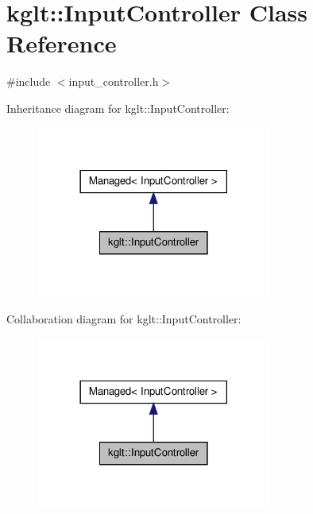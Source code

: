 \hypertarget{classkglt_1_1_input_controller}{\section{kglt\-:\-:Input\-Controller Class Reference}
\label{classkglt_1_1_input_controller}
}


{\ttfamily \#include $<$input\-\_\-controller.\-h$>$}



Inheritance diagram for kglt\-:\-:Input\-Controller\-:\nopagebreak
\begin{figure}[H]
\begin{center}
\leavevmode
\includegraphics[width=218pt]{classkglt_1_1_input_controller__inherit__graph}
\end{center}
\end{figure}


Collaboration diagram for kglt\-:\-:Input\-Controller\-:\nopagebreak
\begin{figure}[H]
\begin{center}
\leavevmode
\includegraphics[width=218pt]{classkglt_1_1_input_controller__coll__graph}
\end{center}
\end{figure}
